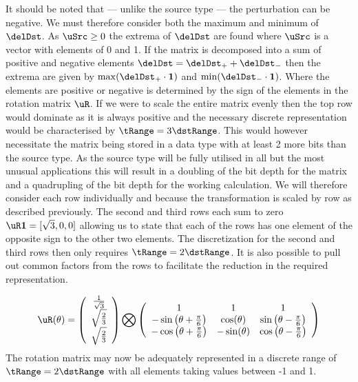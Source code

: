 It should be noted that --- unlike the source type \uSrc --- the perturbation can be negative. We must therefore consider both the maximum and minimum of $\delDst$. As $\uSrc \ge 0$ the extrema of $\delDst$ are found where $\uSrc$ is a vector with elements of 0 and 1. If the matrix is decomposed into a sum of positive and negative elements $\delDst = \delDst_+ + \delDst_-$ then the extrema are given by $\max(\delDst_+ \cdot \mathbf{1})$ and $\min(\delDst_- \cdot \mathbf{1})$. Where the elements are positive or negative is determined by the sign of the elements in the rotation matrix $\uR$. If we were to scale the entire matrix evenly then the top row would dominate as it is always positive and the necessary discrete representation would be characterised by $\tRange = 3 \dstRange$. This would however necessitate the matrix being stored in a data type with at least 2 more bits than the source type. As the source type will be fully utilised in all but the most unusual applications this will result in a doubling of the bit depth for the matrix and a quadrupling of the bit depth for the working calculation. We will therefore consider each row individually and because the transformation is scaled by row as described previously. The second and third rows each sum to zero $\uR \mathbf{1} = [\sqrt{3},0,0]$ allowing us to state that each of the rows has one element of the opposite sign to the other two elements. The discretization for the second and third rows then only requires $\tRange = 2 \dstRange$. It is also possible to pull out common factors from the rows to facilitate the reduction in the required representation. 

\begin{equation}
\uR(\theta) = 
\left(
\begin{array}{c}
 \frac{1}{\sqrt{3}} \\
 \sqrt{\frac{2}{3}}  \\
 \sqrt{\frac{2}{3}} \\
\end{array}
\right) \bigotimes
\left(
\begin{array}{ccc}
 1 & 1 & 1 \\
 -\sin \left(\theta +\frac{\pi }{6}\right) &  \cos (\theta ) &  \sin \left(\theta -\frac{\pi }{6}\right) \\
 -\cos \left(\theta +\frac{\pi }{6}\right) & - \sin (\theta ) & \cos \left(\theta -\frac{\pi }{6}\right) \\
\end{array}
\right)
\end{equation}
The rotation matrix may now be adequately represented in a discrete range of $\tRange = 2 \dstRange$ with all elements taking values between -1 and 1. 

